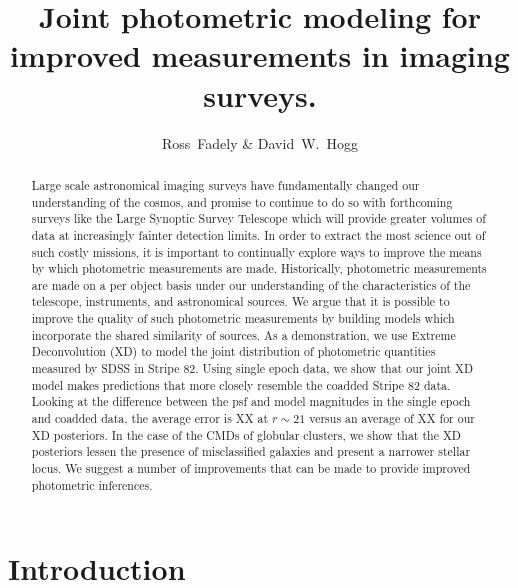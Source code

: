 \documentclass[12pt,preprint]{aastex}
\begin{document}
\title{Joint photometric modeling for improved measurements in imaging surveys.}
\author{Ross~Fadely \&
        David~W.~Hogg}


%
%
\begin{abstract}
Large scale astronomical imaging surveys have fundamentally changed our 
understanding of the cosmos, and promise to continue to do so with 
forthcoming surveys like the Large Synoptic Survey Telescope which will 
provide greater volumes of data at increasingly fainter detection limits.  
In order to extract the most science out of such costly missions, it is 
important to continually explore ways to improve the means by which photometric 
measurements are made.  Historically, photometric measurements are made 
on a per object basis under our understanding of the characteristics of 
the telescope, instruments, and astronomical sources.  We argue that it 
is possible to improve the quality of such photometric measurements by 
building models which incorporate the shared similarity of sources.  As 
a demonstration, we use Extreme Deconvolution (XD) to model the joint 
distribution of photometric quantities measured by SDSS in Stripe 82.  
Using single epoch data, we show that our joint XD model makes predictions 
that more closely resemble the coadded Stripe 82 data.  Looking at the 
difference between the psf and model magnitudes in the single epoch and 
coadded data, the average error is XX at $r\sim21$ versus an average of 
XX for our XD posteriors.  In the case of the CMDs of globular clusters, 
we show that the XD posteriors lessen the presence of misclassified 
galaxies and present a narrower stellar locus.  We suggest a number of 
improvements that can be made to provide improved photometric inferences.
\end{abstract}

%
%
\section{Introduction}


%
%
\end{document}
